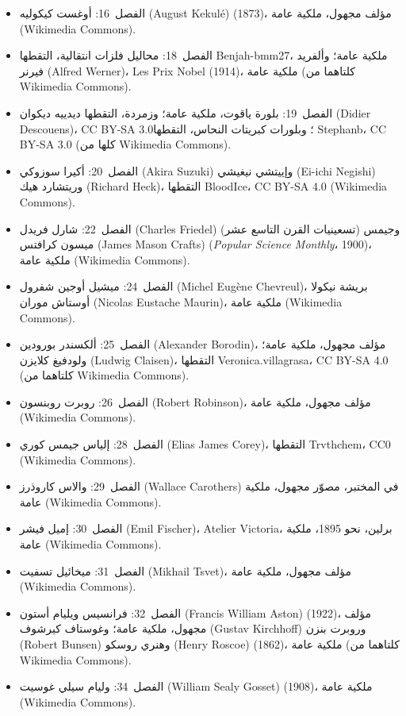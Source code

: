 \begin{itemize}
        Commons).
  \item الفصل~16: أوغست كيكوليه (August Kekul\'e) (1873)، مؤلف مجهول، ملكية عامة
        (Wikimedia Commons).
  \item الفصل~18: محاليل فلزات انتقالية، التقطها Benjah-bmm27، ملكية عامة؛ وألفريد
        فيرنر (Alfred Werner)، Les Prix Nobel (1914)، ملكية عامة (كلتاهما من Wikimedia Commons).
  \item الفصل~19: بلورة ياقوت، ملكية عامة؛ وزمردة، التقطها ديدييه ديكوان (Didier Descouens)،
        CC BY-SA 3.0؛ وبلورات كبريتات النحاس، التقطها Stephanb، CC BY-SA 3.0 (كلها من
        Wikimedia Commons).
  \item الفصل~20: أكيرا سوزوكي (Akira Suzuki) وإييتشي نيغيشي (Ei-ichi Negishi) وريتشارد هيك (Richard Heck)،
        التقطها BloodIce، CC BY-SA 4.0 (Wikimedia Commons).
  \item الفصل~22: شارل فريدل (Charles Friedel) (تسعينيات القرن التاسع عشر) وجيمس ميسون كرافتس
        (James Mason Crafts) (\textit{Popular Science Monthly}، 1900)، ملكية عامة (Wikimedia Commons).
  \item الفصل~24: ميشيل أوجين شفرول (Michel Eug\`ene Chevreul)، بريشة نيكولا أوستاش موران
        (Nicolas Eustache Maurin)، ملكية عامة (Wikimedia Commons).
  \item الفصل~25: ألكسندر بورودين (Alexander Borodin)، مؤلف مجهول، ملكية عامة؛ ولودفيغ كلايزن
        (Ludwig Claisen)، التقطها Veronica.villagrasa، CC BY-SA 4.0 (كلتاهما من Wikimedia Commons).
  \item الفصل~26: روبرت روبنسون (Robert Robinson)، مؤلف مجهول، ملكية عامة (Wikimedia Commons).
  \item الفصل~28: إلياس جيمس كوري (Elias James Corey)، التقطها Trvthchem، CC0 (Wikimedia Commons).
  \item الفصل~29: والاس كاروذرز (Wallace Carothers) في المختبر، مصوّر مجهول، ملكية عامة
        (Wikimedia Commons).
  \item الفصل~30: إميل فيشر (Emil Fischer)، Atelier Victoria، برلين، نحو 1895، ملكية عامة
        (Wikimedia Commons).
  \item الفصل~31: ميخائيل تسفيت (Mikhail Tsvet)، مؤلف مجهول، ملكية عامة (Wikimedia Commons).
  \item الفصل~32: فرانسيس ويليام أستون (Francis William Aston) (1922)، مؤلف مجهول، ملكية عامة؛
        وغوستاف كيرشوف (Gustav Kirchhoff) وروبرت بنزن (Robert Bunsen) وهنري روسكو (Henry Roscoe) (1862)،
        ملكية عامة (كلتاهما من Wikimedia Commons).
  \item الفصل~34: وليام سيلي غوسيت (William Sealy Gosset) (1908)، ملكية عامة (Wikimedia Commons).
\end{itemize}
\clearpage
